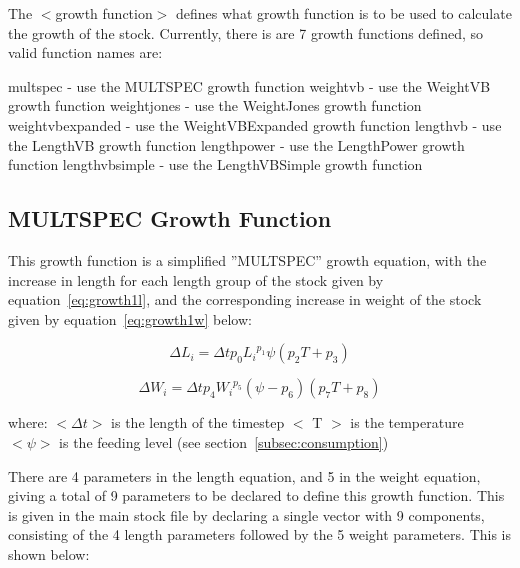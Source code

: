 \documentclass [a4paper, 10pt]{book}
\begin{document}
The $<$growth function$>$ defines what growth function is to be used to calculate the growth of the stock.  Currently, there is are 7 growth functions defined, so valid function names are:

\bigskip
multspec - use the MULTSPEC growth function\newline
weightvb - use the WeightVB growth function\newline
weightjones - use the WeightJones growth function\newline
weightvbexpanded - use the WeightVBExpanded growth function\newline
lengthvb - use the LengthVB growth function\newline
lengthpower - use the LengthPower growth function\newline
lengthvbsimple - use the LengthVBSimple growth function

\subsection{MULTSPEC Growth Function}\label{subsec:growth1}
This growth function is a simplified ''MULTSPEC'' growth equation\footnotemark, with the increase in length for each length group of the stock given by equation~\ref{eq:growth1l}, and the corresponding increase in weight of the stock given by equation~\ref{eq:growth1w} below:

\begin{equation}\label{eq:growth1l}
\Delta L_{i} = \Delta t p_{0} {L_{i}}^{p_{1}} \psi (p_{2} T + p_{3})
\end{equation}

\begin{equation}\label{eq:growth1w}
\Delta W_{i} = \Delta t p_{4} {W_{i}}^{p_{5}} (\psi - p_{6}) (p_{7} T + p_{8})
\end{equation}

where:\newline
$<\Delta t>$ is the length of the timestep\newline
$<$ T $>$ is the temperature\newline
$<\psi>$ is the feeding level (see section~\ref{subsec:consumption})

\bigskip
There are 4 parameters in the length equation, and 5 in the weight equation, giving a total of 9 parameters to be declared to define this growth function.  This is given in the main stock file by declaring a single vector with 9 components, consisting of the 4 length parameters followed by the 5 weight parameters.  This is shown below:
\end{document}
